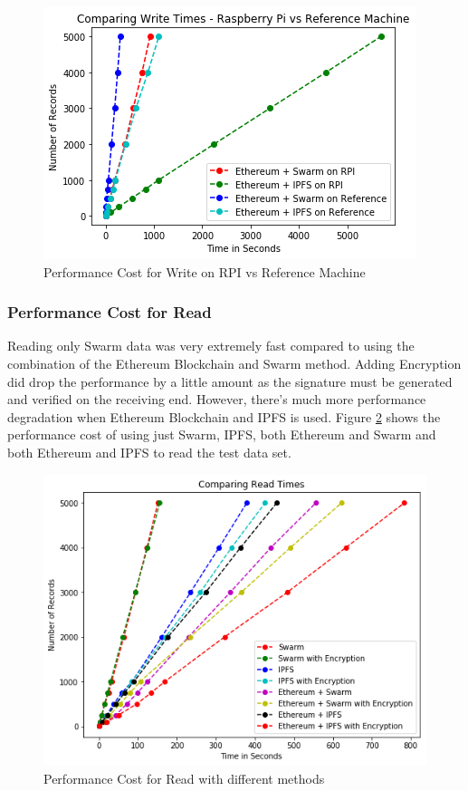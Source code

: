 \documentclass[11pt,openright]{report}
\begin{document}
\begin{figure}
    \centering
    \includegraphics[scale=1]{results/graphs/WriteComp_Pi_v_Ref.png}
    \caption{Performance Cost for Write on RPI vs Reference Machine}
    \label{fig:graph_perf_cost_write_pi_ref}
\end{figure}


\subsubsection{Performance Cost for Read}
Reading only Swarm data was very extremely fast compared to using the combination of the Ethereum Blockchain and Swarm method. Adding Encryption did drop the performance by a little amount as the signature must be generated and verified on the receiving end. However, there's much more performance degradation when Ethereum Blockchain and IPFS is used. Figure \ref{fig:graph_perf_cost_read} shows the performance cost of using just Swarm, IPFS, both Ethereum and Swarm and both Ethereum and IPFS to read the test data set.

\begin{figure}
    \centering
    \includegraphics[scale=0.8]{results/graphs/ReadComp.png}
    \caption{Performance Cost for Read with different methods}
    \label{fig:graph_perf_cost_read}
\end{figure}
\end{document}

